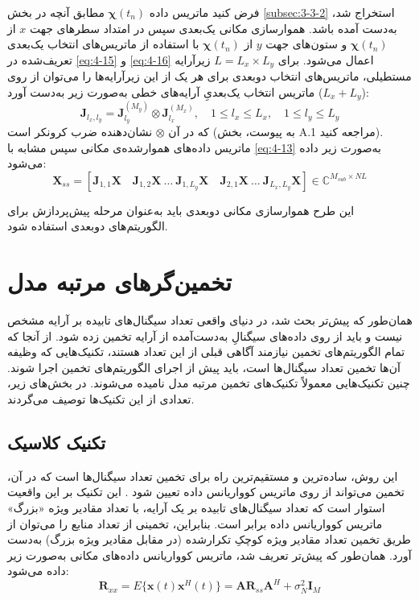 فرض کنید ماتریس داده $\bm{\chi}(t_n)$ مطابق آنچه در بخش \ref{subsec:3-3-2} استخراج شد، به‌دست آمده باشد. هموارسازی مکانی یک‌بعدی سپس در امتداد سطرهای جهت $x$ از $\bm{\chi}(t_n)$ و ستون‌های جهت $y$ از $\bm{\chi}(t_n)$ با استفاده از ماتریس‌های انتخاب یک‌بعدی تعریف‌شده در \eqref{eq:4-15} و \eqref{eq:4-16} اعمال می‌شود. برای $L = L_x \times L_y$ زیرآرایه مستطیلی، ماتریس‌های انتخاب دوبعدی برای هر یک از این زیرآرایه‌ها را می‌توان از روی ($L_x + L_y$) ماتریس انتخاب یک‌بعدیِ آرایه‌های خطی به‌صورت زیر به‌دست آورد:
\begin{equation}
	\bm{J}_{l_x, l_y} = \bm{J}_{l_y}^{(M_y)} \otimes \bm{J}_{l_x}^{(M_x)}, \quad 1 \leq l_x \leq L_x, \quad 1 \leq l_y \leq L_y
	\label{eq:4-17}
\end{equation}
که در آن $\otimes$ نشان‌دهنده ضرب کرونکر است (به پیوست، بخش A.1 مراجعه کنید). ماتریس داده‌های هموارشده‌ی مکانی سپس مشابه با \eqref{eq:4-13} به‌صورت زیر داده می‌شود:
\begin{equation}
	\bm{X}_{ss} = [\bm{J}_{1,1}\bm{X} \quad \bm{J}_{1,2}\bm{X} \ \ldots \  \bm{J}_{1,L_y}\bm{X} \quad \bm{J}_{2,1}\bm{X} \ \ldots \ \bm{J}_{L_x,L_y}\bm{X}] \in \mathbb{C}^{M_{sub} \times NL}
	\label{eq:4-18}
\end{equation}

این طرح هموارسازی مکانی دوبعدی باید به‌عنوان مرحله پیش‌پردازش برای الگوریتم‌های  دوبعدی استفاده شود.


\section{تخمین‌گرهای مرتبه مدل}
\label{sec:4-3}
همان‌طور که پیش‌تر بحث شد، در دنیای واقعی تعداد سیگنال‌های تابیده بر آرایه مشخص نیست و باید از روی داده‌های سیگنالِ به‌دست‌آمده از آرایه تخمین زده شود. از آنجا که تمام الگوریتم‌های تخمین  نیازمند آگاهی قبلی از این تعداد هستند، تکنیک‌هایی که وظیفه آن‌ها تخمین تعداد سیگنال‌ها است، باید پیش از اجرای الگوریتم‌های تخمین  اجرا شوند. چنین تکنیک‌هایی معمولاً تکنیک‌های تخمین مرتبه مدل نامیده می‌شوند. در بخش‌های زیر، تعدادی از این تکنیک‌ها توصیف می‌گردند.

\subsection{تکنیک کلاسیک}
\label{subsec:4-3-1}
این روش، ساده‌ترین و مستقیم‌ترین راه برای تخمین تعداد سیگنال‌ها است که در آن، تخمین می‌تواند از روی ماتریس کوواریانس داده تعیین شود \cite{4-8}. این تکنیک بر این واقعیت استوار است که تعداد سیگنال‌های تابیده بر یک آرایه، با تعداد مقادیر ویژه «بزرگ» ماتریس کوواریانس داده برابر است. بنابراین، تخمینی از تعداد منابع را می‌توان از طریق تخمین تعداد مقادیر ویژه کوچکِ تکرارشده (در مقابل مقادیر ویژه بزرگ) به‌دست آورد. همان‌طور که پیش‌تر تعریف شد، ماتریس کوواریانس داده‌های مکانی به‌صورت زیر داده می‌شود:
\begin{equation}
	\bm{R}_{xx} = E\{\bm{x}(t)\bm{x}^H(t)\} = \bm{A}\bm{R}_{ss}\bm{A}^H + \sigma_N^2 \bm{I}_M
	\label{eq:4-19}
\end{equation}

